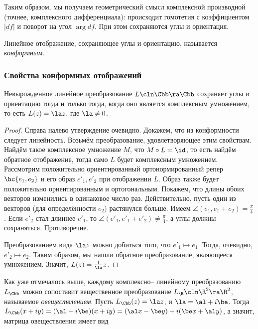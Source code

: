 \documentclass[a4paper]{article}
\begin{document}
Таким образом, мы получаем геометрический смысл комплексной производной (точнее, комплексного дифференциала):
происходит гомотетия с коэффициентом $|df|$ и поворот на угол $\arg df$. При этом сохраняются углы и ориентация.

\begin{df}
Линейное отображение, сохраняющее углы и ориентацию, называется \emph{конформным}.
\end{df}

\subsubsection{Свойства конформных отображений}
\label{ConformMappings}
\begin{prop}
Невырожденное линейное преобразование $L\cln \Cbb\ra\Cbb$ сохраняет углы и ориентацию
тогда и только тогда, когда оно является комплексным умножением, то есть
$L(z) = \la z$, где $\la \neq 0$.
\end{prop}
\begin{proof}
Справа налево утверждение очевидно. Докажем, что из конформности следует линейность.
Возьмём преобразование, удовлетворяющее этим свойствам. Найдём такое комплексное умножение
$M$, что $M \circ L = \id$, то есть найдём обратное отображение, тогда само $L$ будет комплексным умножением.
Рассмотрим положительно ориентированный ортонормированный репер
$\hc{e_1, e_2}$ и его образ ${e'_1, e'_2}$ при отображении $L$. Образ также будет положительно
ориентированным и ортогональным. Покажем, что длины обоих векторов изменились в одинаковое число раз.
Действительно, пусть один из векторов (для определённости $e_2$) растянулся больше.
Имеем $\angle (e_1, e_1+e_2) = \frac{\pi}{4}$. Если $e'_2$ стал
длиннее $e'_1$, то $\angle(e'_1,e'_1+e'_2) \neq \frac{\pi}{4}$, а углы должны сохраняться. Противоречие.

Преобразованием вида $\la z$ можно добиться того, что $e'_1 \mapsto e_1$. Тогда, очевидно, $e'_2 \mapsto e_2$.
Таким образом, мы нашли обратное преобразование, являющееся умножением. Значит, $L(z) = \frac{1}{\la}z$.
\end{proof}

Как уже отмечалось выше, каждому комплексно-- линейному преобразованию $L_\Cbb$ можно сопоставит вещественное
преобразование $L_\R\cln\R^2\ra\R^2$, называемое \emph{овеществлением}. Пусть $L_\Cbb(z) = \la z$, и $\la = \al+i\be$.
Тогда $L_\Cbb(x+iy) = (\al+i\be)(x+iy)=(\al x-\be y)+i(\be x+\al y)$, а значит, матрица овеществления имеет вид
\end{document}
